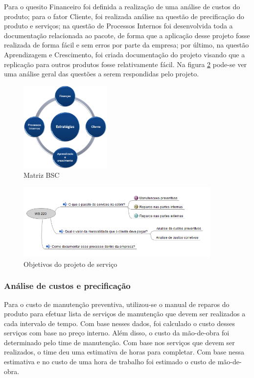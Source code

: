 \documentclass[12pt]{article}
\begin{document}
	Para o quesito Financeiro foi definida a realização de uma análise de custos do produto; para o fator Cliente, foi realizada análise na questão de precificação do produto e serviços; na questão de Processos Internos foi desenvolvida toda a documentação relacionada ao pacote, de forma que a aplicação desse projeto fosse realizada de forma fácil e sem erros por parte da empresa; por último, na questão Aprendizagem e Crescimento, foi criada documentação do projeto visando que a replicação para outros produtos fosse relativamente fácil. Na figura \ref{fig:service} pode-se ver uma análise geral das questões a serem respondidas pelo projeto.

\begin{figure}[h!]
	\centering
	\includegraphics[width=0.4\textwidth]{img/bsc.png}
	\caption{Matriz BSC}
	\label{fig:bsc}
\end{figure}

\begin{figure}[h!]
	\centering
	\includegraphics[width=0.9\textwidth]{img/ws220.png}
	\caption{Objetivos do projeto de serviço}
	\label{fig:service}
\end{figure}

\subsubsection{Análise de custos e precificação}

	Para o custo de manutenção preventiva, utilizou-se o manual de reparos do produto para efetuar lista de serviços de manutenção que devem ser realizados a cada intervalo de tempo. Com base nesses dados, foi calculado o custo desses serviços com base no preço interno. Além disso, o custo da mão-de-obra foi determinado pelo time de manutenção. Com base nos serviços que devem ser realizados, o time deu uma estimativa de horas para completar. Com base nessa estimativa e no custo de uma hora de trabalho foi estimado o custo de mão-de-obra.
\end{document}
